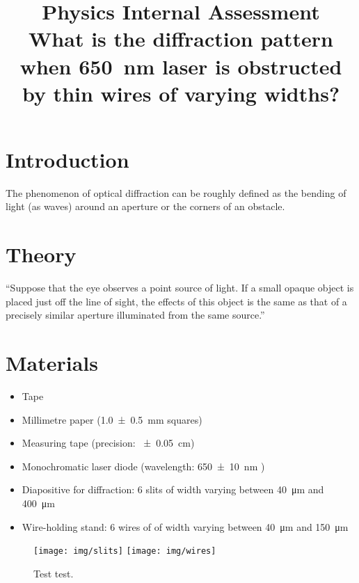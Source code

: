 \documentclass[a4paper, 12pt]{article}
\title{
\textbf{Physics Internal Assessment}\\
\bigskip
What is the diffraction pattern when \SI{650}{\nm} laser is obstructed by thin wires of varying widths?
}
\author{}
\date{}
\begin{document}
\maketitle

\section*{Introduction}
The phenomenon of optical diffraction can be roughly defined as the bending of light   (as waves) around an aperture or the corners of an obstacle.

\section*{Theory}

\cite{babinet}
\begin{displayquote}
    ``Suppose that the eye observes a point source of light. If a small opaque object is placed just off the line of sight, the effects of this object is the same as that of a precisely similar aperture illuminated from the same source.''
\end{displayquote}

\newpage

\section*{Materials}
\begin{itemize}
\itemsep 0em
    \item Tape
    \item Millimetre paper (\SI{1.0+-.5}{\mm} squares)
    \item Measuring tape (precision: \SI{+-.05}{\cm})
    \item Monochromatic laser diode (wavelength: \SI{650+-10}{\nm} \cite{laser-specs})
    \item Diapositive for diffraction: 6 slits of width varying between \SI{40}{\um} and \SI{400}{\um}
    \item Wire-holding stand: 6 wires of of width varying between \SI{40}{\um} and \SI{150}{\um} \cite{wires-specs}
\end{itemize}

\begin{figure}[H]
    \centering
        \centering
        \texttt{[image: img/slits]}
    \endminipage\hfill
        \centering
        \texttt{[image: img/wires]}
    \endminipage\hfill
    \caption{Test test. }
    \label{fig:slits-wires}
\end{figure}
\end{document}
